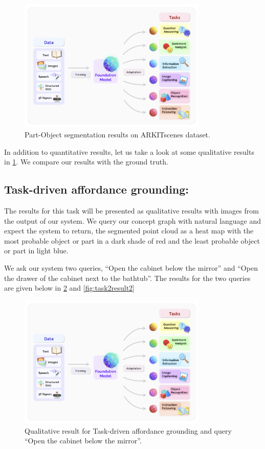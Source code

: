 \begin{figure}[ht!]
    \centering
    \includegraphics[width=0.8\textwidth]{images/FoundationModels.png}
    \caption{Part-Object segmentation results on ARKITscenes dataset.}
    \label{fig:task1result1}
\end{figure}
In addition to quantitative results, let us take a look at some qualitative results in \cref{fig:task1result1}. We compare our results with the ground truth.

\subsection{Task-driven affordance grounding:}
The results for this task will be presented as qualitative results with images from the output of our system. We query our concept graph with natural language
 and expect the system to return, the segmented point cloud as a heat map with the most probable object or part in a dark shade of red and 
 the least probable object or part in light blue. 

We ask our system two queries, \enquote{Open the cabinet below the mirror} and \enquote{Open the drawer of the cabinet next to the bathtub}. 
The results for the two queries are given below in \cref{fig:task2result1} and \cref{fig:task2result2}

\begin{figure}[ht!]
    \centering
    \includegraphics[width=0.8\textwidth]{images/FoundationModels.png}
    \caption{Qualitative result for Task-driven affordance grounding and query \enquote{Open the cabinet below the mirror}.}
    \label{fig:task2result1}
\end{figure}


